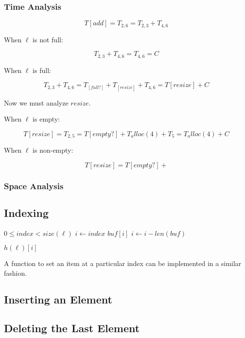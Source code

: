 \documentclass{article}
\begin{document}
	\subsubsection{Time Analysis}
	
	$$
	T[add] = T_{2,6} = T_{2,3} + T_{4, 6}
	$$
	
	When $\ell$ is not full:
	
	$$
	T_{2,3} + T_{4,6} = T_{4,6} = C
	$$
	
	When $\ell$ is full:
	
	$$
	T_{2,3} + T_{4,6} = T_[full?] + T_[resize] + T_{4,6} = T[resize] + C
	$$
	
	Now we must analyze $resize$.
	
	When $\ell$ is empty:
	
	$$
	T[resize] = T_{2,5} = T[empty?] + T_alloc(4) + T_5 = T_alloc(4) + C
	$$
	
	When $\ell$ is non-empty:
	
	$$
	T[resize] = T[empty?] + 
	$$
	
	\subsubsection{Space Analysis}
	
	\subsection{Indexing}
	
	\begin{algorithm}\begin{algorithmic}[1]
	 			\Require
	 				\Statex $0 \leq index < size(\ell)$
	 			\State $i \gets index$
	 					\State \Return $buf[i]$
	 				\EndIf
	 				\State $i \gets i - len(buf)$
	 			\EndFor
	 			
	 			\Return $h(\ell)[i]$
 			\EndFunction
		\end{algorithmic}\end{algorithm}

	A function to set an item at a particular index can be implemented in a similar fashion.
	
	\subsection{Inserting an Element}
	
	\subsection{Deleting the Last Element}
	
\end{document}
